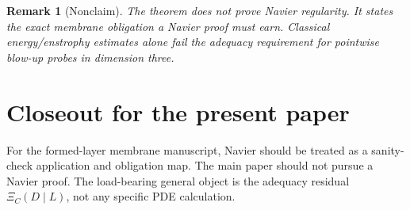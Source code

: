 \documentclass[11pt]{article}
\newtheorem{remark}{Remark}
\begin{document}
\begin{remark}[Nonclaim]
The theorem does not prove Navier regularity. It states the exact membrane obligation a Navier proof must earn. Classical energy/enstrophy estimates alone fail the adequacy requirement for pointwise blow-up probes in dimension three.
\end{remark}

\section{Closeout for the present paper}
For the formed-layer membrane manuscript, Navier should be treated as a sanity-check application and obligation map. The main paper should not pursue a Navier proof. The load-bearing general object is the adequacy residual $\Xi_C(D\mid L)$, not any specific PDE calculation.
\end{document}
